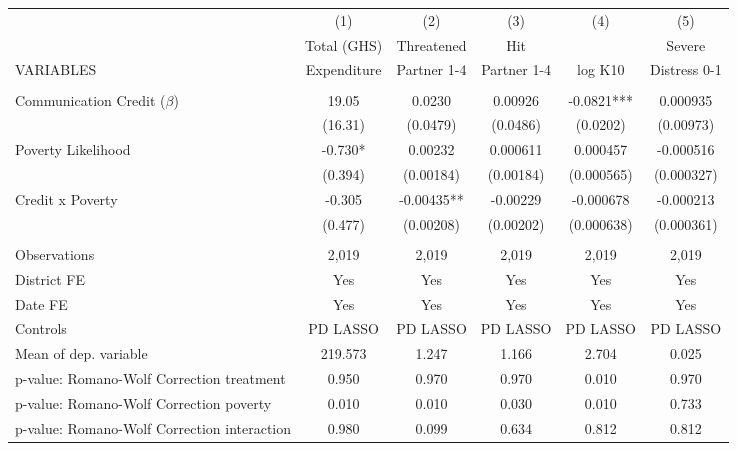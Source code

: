 \begin{tabular}{lccccc} \hline
 & (1) & (2) & (3) & (4) & (5) \\
 & Total (GHS) & Threatened & Hit &  & Severe \\
VARIABLES & Expenditure & Partner 1-4 & Partner 1-4 & log K10 & Distress 0-1 \\ \hline
 &  &  &  &  &  \\
Communication Credit ($\beta$) & 19.05 & 0.0230 & 0.00926 & -0.0821*** & 0.000935 \\
 & (16.31) & (0.0479) & (0.0486) & (0.0202) & (0.00973) \\
Poverty Likelihood & -0.730* & 0.00232 & 0.000611 & 0.000457 & -0.000516 \\
 & (0.394) & (0.00184) & (0.00184) & (0.000565) & (0.000327) \\
Credit x Poverty & -0.305 & -0.00435** & -0.00229 & -0.000678 & -0.000213 \\
 & (0.477) & (0.00208) & (0.00202) & (0.000638) & (0.000361) \\
 &  &  &  &  &  \\
Observations & 2,019 & 2,019 & 2,019 & 2,019 & 2,019 \\
District FE & Yes & Yes & Yes & Yes & Yes \\
Date FE & Yes & Yes & Yes & Yes & Yes \\
Controls & PD LASSO & PD LASSO & PD LASSO & PD LASSO & PD LASSO \\
Mean of dep. variable & 219.573 & 1.247 & 1.166 & 2.704 & 0.025 \\
p-value: Romano-Wolf Correction treatment & 0.950 & 0.970 & 0.970 & 0.010 & 0.970 \\
p-value: Romano-Wolf Correction poverty & 0.010 & 0.010 & 0.030 & 0.010 & 0.733 \\
 p-value: Romano-Wolf Correction interaction & 0.980 & 0.099 & 0.634 & 0.812 & 0.812 \\ \hline
\end{tabular}
